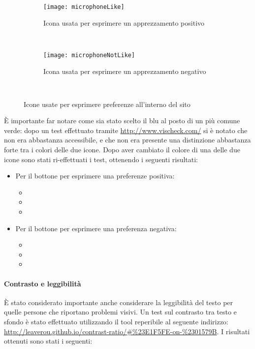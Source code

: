 \begin{figure}[H]
    \centering
    \begin{subfigure}[b]{0.4\textwidth}
        \texttt{[image: microphoneLike]}
        \caption{Icona usata per esprimere un apprezzamento positivo}
    \end{subfigure}
    ~
    \begin{subfigure}[b]{0.4\textwidth}
        \texttt{[image: microphoneNotLike]}
        \caption{Icona usata per esprimere un apprezzamento negativo}
    \end{subfigure}
    ~
    \caption{Icone usate per esprimere preferenze all'interno del sito}
\end{figure}

\`E importante far notare come sia stato scelto il blu al posto di un pi\`u comune verde: dopo un test effettuato tramite \url{http://www.vischeck.com/} si \`e notato che non era abbastanza accessibile, e che non era presente una distinzione abbastanza forte tra i colori delle due icone. Dopo aver cambiato il colore di una delle due icone sono stati ri-effettuati i test, ottenendo i seguenti risultati:
\begin{itemize}

    \item Per il bottone per esprimere una preferenze positiva:
    \begin{itemize}

        \item[]

        \item[]

        \item[]

    \end{itemize}

    \item Per il bottone per esprimere una preferenza negativa:
    \begin{itemize}

        \item[]

        \item[]

        \item[]

    \end{itemize}

\end{itemize}

\paragraph*{Contrasto e leggibilit\`a}
\`E stato considerato importante anche considerare la leggibilit\`a del testo per quelle persone che riportano problemi visivi. Un test sul contrasto tra testo e sfondo \`e stato effettuato utilizzando il tool reperibile al seguente indirizzo: \url{http://leaverou.github.io/contrast-ratio/#\%23E1F5FE-on-\%2301579B}.
I risultati ottenuti sono stati i seguenti: %

